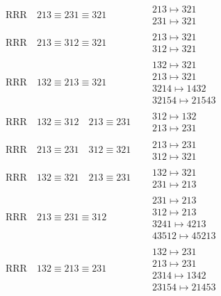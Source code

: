 \documentclass{article}
\begin{document}
\begin{align}
\\
\text{RRR}
\quad
213\equiv231\equiv321
\quad
&
\begin{matrix}
213 \mapsto 321
\\
231 \mapsto 321
\end{matrix}
\\
\text{RRR}
\quad
213\equiv312\equiv321
\quad
&
\begin{matrix}
213 \mapsto 321
\\
312 \mapsto 321
\end{matrix}
\\
\text{RRR}
\quad
132\equiv213\equiv321
\quad
&
\begin{matrix}
132 \mapsto 321
\\
213 \mapsto 321
\\
3214 \mapsto 1432
\\
32154 \mapsto 21543
\end{matrix}
\\
\text{RRR}
\quad
132\equiv312
\quad
213\equiv231
\quad
&
\begin{matrix}
312 \mapsto 132
\\
213 \mapsto 231
\end{matrix}
\\
\text{RRR}
\quad
213\equiv231
\quad
312\equiv321
\quad
&
\begin{matrix}
213 \mapsto 231
\\
312 \mapsto 321
\end{matrix}
\\
\text{RRR}
\quad
132\equiv321
\quad
213\equiv231
\quad
&
\begin{matrix}
132 \mapsto 321
\\
231 \mapsto 213
\end{matrix}
\\
\text{RRR}
\quad
213\equiv231\equiv312
\quad
&
\begin{matrix}
231 \mapsto 213
\\
312 \mapsto 213
\\
3241 \mapsto 4213
\\
43512 \mapsto 45213
\end{matrix}
\\
\text{RRR}
\quad
132\equiv213\equiv231
\quad
&
\begin{matrix}
132 \mapsto 231
\\
213 \mapsto 231
\\
2314 \mapsto 1342
\\
23154 \mapsto 21453
\end{matrix}
\\

\end{align}
\end{document}
